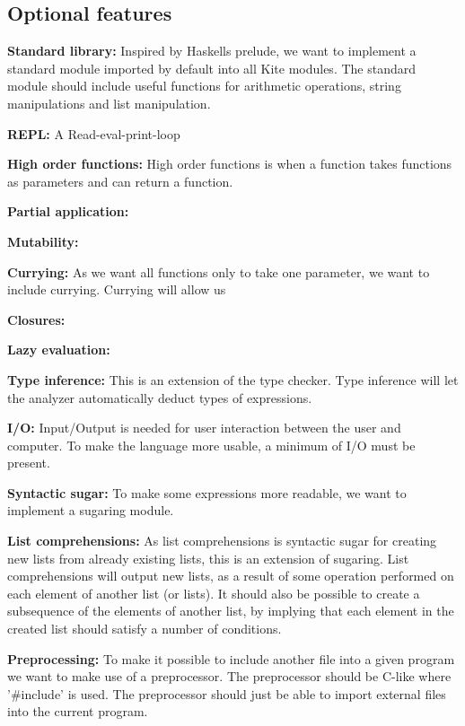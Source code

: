 \subsection{Optional features}

\textbf{Standard library:} Inspired by Haskells prelude, we want to
implement a standard module imported by default into all Kite
modules. The standard module should include useful functions for
arithmetic operations, string manipulations and list manipulation.

\textbf{REPL:} A Read-eval-print-loop 

\textbf{High order functions:} High order functions is when a
function takes functions as parameters and can return a function.

\textbf{Partial application:}

\textbf{Mutability:}

\textbf{Currying:} As we want all functions only to take one
parameter, we want to include currying. Currying will allow us 

\textbf{Closures:} 

\textbf{Lazy evaluation:} 

\textbf{Type inference:} This is an extension of the type
checker. Type inference will let the analyzer automatically deduct
types of expressions. 

\textbf{I/O:} Input/Output is needed for user interaction between the
user and computer. To make the language more usable, a minimum of I/O
must be present.

\textbf{Syntactic sugar:} To make some expressions more readable, we want to
implement a sugaring module.

\textbf{List comprehensions:} As list comprehensions is syntactic
sugar for creating new lists from already existing lists, this is an
extension of sugaring. List comprehensions will output new lists, as a
result of some operation performed on each element of another list (or
lists). It should also be possible to create a subsequence of the
elements of another list, by implying that each element in the created
list should satisfy a number of conditions.

\textbf{Preprocessing:} To make it possible to include another file
into a given program we want to make use of a preprocessor. The
preprocessor should be C-like where '\#include' is used. The
preprocessor should just be able to import external files into the
current program.





